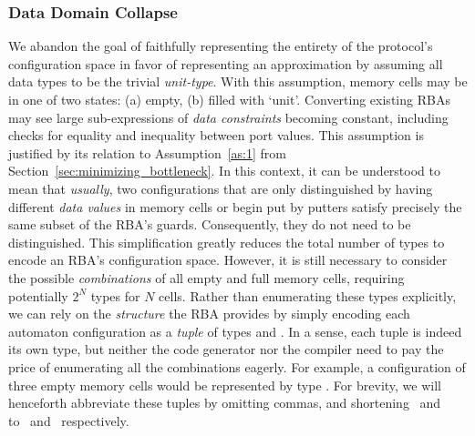 \subsubsection{Data Domain Collapse}
\label{sec:approximating_rba}
We abandon the goal of faithfully representing the entirety of the protocol's configuration space in favor of representing an approximation by assuming all data types to be the trivial \textit{unit-type}. With this assumption, memory cells may be in one of two states: (a) empty, (b) filled with `unit'. Converting existing RBAs may see large sub-expressions of \textit{data constraints} becoming constant, including checks for equality and inequality between port values. This assumption is justified by its relation to Assumption~\ref{as:1} from Section~\ref{sec:minimizing_bottleneck}. In this context, it can be understood to mean that \textit{usually}, two configurations that are only distinguished by having different \textit{data values} in memory cells or begin put by putters satisfy precisely the same subset of the RBA's guards. Consequently, they do not need to be distinguished. This simplification greatly reduces the total number of types to encode an RBA's configuration space. However, it is still necessary to consider the possible \textit{combinations} of all empty and full memory cells, requiring potentially $2^N$ types for $N$ cells. Rather than enumerating these types explicitly, we can rely on the \textit{structure} the RBA provides by simply encoding each automaton configuration as a \textit{tuple} of types  and . In a sense, each tuple is indeed its own type, but neither the code generator nor the compiler need to pay the price of enumerating all the combinations eagerly. For example, a configuration of three empty memory cells would be represented by type . For brevity, we will henceforth abbreviate these tuples by omitting commas, and shortening~ and~ to~ and~ respectively.


